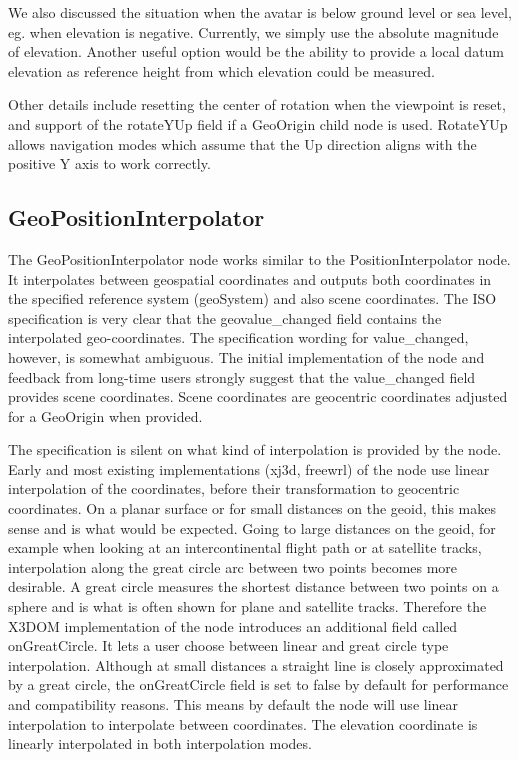 \documentclass{acmsiggraph}                     %
\begin{document}
We also discussed the situation when the avatar is below ground level or sea level, eg. when
elevation is negative. Currently, we simply use the absolute magnitude of elevation. Another useful
option would be the ability to provide a local datum elevation as reference height from which
elevation could be measured.

Other details include resetting the center of rotation when the viewpoint is reset, and support of
the rotateYUp field if a GeoOrigin child node is used. RotateYUp allows navigation modes which
assume that the Up direction aligns with the positive Y axis to work correctly.


\subsection{GeoPositionInterpolator}

The GeoPositionInterpolator node works similar to the PositionInterpolator node. It interpolates
between geospatial coordinates and outputs both coordinates in the specified reference system
(geoSystem) and also scene coordinates. The ISO specification is very clear that the
geovalue\_changed field contains the interpolated geo-coordinates. The specification wording for
value\_changed, however, is somewhat ambiguous. The initial implementation of the node
\cite{reddy2000} and feedback from long-time users strongly suggest that the value\_changed field
provides scene coordinates. Scene coordinates are geocentric coordinates adjusted for a GeoOrigin
when provided.

The specification is silent on what kind of interpolation is provided by the node. Early
\cite{reddy2000} and most existing implementations (xj3d, freewrl) of the node use linear
interpolation of the coordinates, before their transformation to geocentric coordinates. On a planar
surface or for small distances on the geoid, this makes sense and is what would be expected. Going
to large distances on the geoid, for example when looking at an intercontinental flight path or at
satellite tracks, interpolation along the great circle arc between two points becomes more
desirable. A great circle measures the shortest distance between two points on a sphere and is what
is often shown for plane and satellite tracks. Therefore the X3DOM implementation of the node
introduces an additional field called onGreatCircle. It lets a user choose between linear and great
circle type interpolation. Although at small distances a  straight line is closely approximated by a
great circle, the onGreatCircle field is set to false by default for performance and compatibility
reasons. This means by default the node will use linear interpolation to interpolate between
coordinates. The elevation coordinate is linearly interpolated in both interpolation modes.
\end{document}
